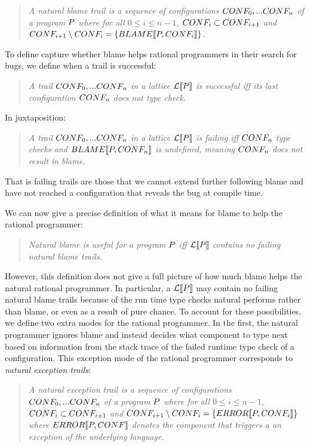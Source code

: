 \begin{quote}
\it 
A natural blame trail
is a sequence of configurations $CONF_0,...CONF_n$ of a program
$P$ where for all $0 \leq i \leq n - 1$, $CONF_i \subset CONF_{i+1}$ and
$CONF_{i+1} \setminus CONF_i = \{BLAME\llbracket P, CONF_i\rrbracket\}$.
\end{quote}

To define capture whether blame helps rational
programmers in their search for bugs, we define when a trail is successful:
\begin{quote}
\it 
A trail $CONF_0,...CONF_n$ in a lattice $\mathcal{L}\llbracket P\rrbracket$ is
\emph{successful}  iff its last configuration $CONF_n$ does not type check.
  \end{quote}
  In juxtaposition:
\begin{quote}
\it 
A trail $CONF_0,...CONF_n$ in a lattice $\mathcal{L}\llbracket P\rrbracket$ is
\emph{failing}  iff $CONF_n$ type checks and $BLAME\llbracket P,CONF_n\rrbracket$ is
undefined, meaning $CONF_n$ does not result in blame. 
 \end{quote}
That is failing trails are those that we cannot extend
further following blame and have not reached a configuration that reveals
the bug at
compile time.

 We can now give a precise definition of what it
means for blame to help the rational programmer:
\begin{quote}
\it
  Natural blame is useful for a program $P$ iff 
  $\mathcal{L}\llbracket P\rrbracket$ contains no failing natural blame trails.
\end{quote}


However, this definition does not give a full picture of how much blame helps the
natural rational programmer. In particular,  a $\mathcal{L}\llbracket P\rrbracket$
may contain no failing natural blame trails because
of the run time type checks natural performs rather than blame, or even as a result
of pure chance. To account for these possibilities, we define two extra
modes for the rational programmer. In the first, the natural programmer
ignores blame and instead decides what component to type next based on
information from the stack trace of the failed runtime type check of a
configuration.  This exception mode of the rational programmer corresponds to \emph{natural
exception trails}:
\begin{quote}
\it 
A natural exception trail
is a sequence of configurations $CONF_0,...CONF_n$ of a program
$P$ where for all $0 \leq i \leq n - 1$, $CONF_i \subset CONF_{i+1}$ and
$CONF_{i+1} \setminus CONF_i = \{ERROR\llbracket P, CONF_i\rrbracket\}$
  where $ERROR\llbracket P, CONF\rrbracket$ denotes the component that triggers a
an exception of the underlying language.
\end{quote}

